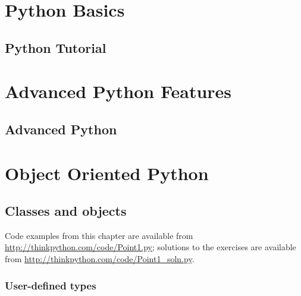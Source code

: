 \documentclass[12pt,a4paper,final,twoside,onecolumn,titlepage]{book}
\begin{document}
%

\part{Python Basics}

\chapter{Python Tutorial}


\part{Advanced Python Features}
\chapter{Advanced Python}




%

\part{Object Oriented Python}
\chapter{Classes and objects}

Code examples from this chapter are available from
\url{http://thinkpython.com/code/Point1.py}; solutions
to the exercises are available from
\url{http://thinkpython.com/code/Point1_soln.py}.


\section{User-defined types}
\label{point}
\end{document}
